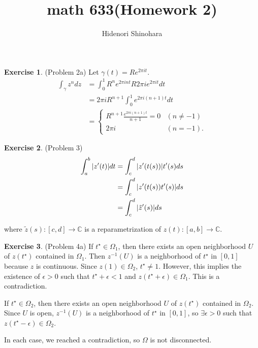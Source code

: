 \documentclass[12pt, psamsfonts]{amsart}
\theoremstyle{definition}
\newtheorem*{exer}{Exercise}
\theoremstyle{remark}
\numberwithin{equation}{section}
\begin{document}
\title{math 633(Homework 2)}
\author{Hidenori Shinohara}
\maketitle

\begin{exer}{(Problem 2a)}
  Let $\gamma(t) = Re^{2\pi it}$.
  \begin{align*}
    \int_{\gamma} z^ndz
      &= \int_{0}^{1} R^ne^{2\pi i nt}R2\pi ie^{2\pi it} dt \\
      &= 2\pi i R^{n + 1}\int_{0}^{1} e^{2\pi i (n + 1)t} dt \\
      &= \begin{cases}
        R^{n + 1} \frac{e^{2\pi i(n + 1)t}}{n + 1} = 0 & (n \ne -1) \\
        2\pi i & (n = -1).
      \end{cases}
  \end{align*}
\end{exer}

\begin{exer}{(Problem 3)}
  \begin{align*}
    \int_a^b \abs{z'(t)} dt
      &= \int_c^d \abs{z'(t(s))}t'(s) ds \\
      &= \int_c^d \abs{z'(t(s))t'(s)} ds \\
      &= \int_c^d \abs{\tilde{z}'(s)} ds
  \end{align*}
  
  where $\tilde{z}(s): [c, d] \rightarrow \mathbb{C}$ is a reparametrization of $z(t): [a, b] \rightarrow \mathbb{C}$.
\end{exer}

\begin{exer}{(Problem 4a)}
  If $t^{\star} \in \Omega_1$, then there exists an open neighborhood $U$ of $z(t^{\star})$ contained in $\Omega_1$.
  Then $z^{-1}(U)$ is a neighborhood of $t^{\star}$ in $[0, 1]$ because $z$ is continuous.
  Since $z(1) \in \Omega_2$, $t^{\star} \ne 1$.
  However, this implies the existence of $\epsilon > 0$ such that $t^{\star} + \epsilon < 1$ and $z(t^{\star} + \epsilon) \in \Omega_1$.
  This is a contradiction.

  If $t^{\star} \in \Omega_2$, then there exists an open neighborhood $U$ of $z(t^{\star})$ contained in $\Omega_2$.
  Since $U$ is open, $z^{-1}(U)$ is a neighborhood of $t^{\star}$ in $[0, 1]$, so $\exists \epsilon > 0$ such that $z(t^{\star} - \epsilon) \in \Omega_2$.

  In each case, we reached a contradiction, so $\Omega$ is not disconnected.
\end{exer}
\end{document}
